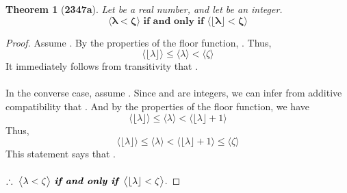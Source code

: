 \documentclass[preview]{standalone}
\newtheorem{theorem}{Theorem}
\begin{document}
\begin{theorem}[\textbf{2347a}]
    Let \bm{$\lambda$} be a real number, 
    and let \bm{$\zeta$} be an integer. 
    \begin{equation*}
        \bm{\big \langle \lambda < \zeta \big \rangle
            \textbf{ if and only if } 
        \big \langle \lfloor \lambda \rfloor < \zeta \big \rangle
        }
    \end{equation*}
\end{theorem}

\begin{proof}
    Assume \bm{$\lambda < \zeta$}. 
    By the properties of the floor function,
    \bm{$\lfloor \lambda \rfloor \leq \lambda$}. 
    Thus,
    \begin{equation*}
        \Big \langle \lfloor \lambda \rfloor \Big \rangle
            \leq 
        \Big \langle \lambda \Big \rangle
            < 
        \Big \langle \zeta \Big \rangle
    \end{equation*}
    It immediately follows from transitivity that 
    \bm{$\lfloor \lambda \rfloor < \zeta$}.
    \\ \\
    In the converse case, 
    assume \bm{$\lfloor \lambda \rfloor < \zeta$}. 
    Since \bm{$\lfloor \lambda \rfloor$} and \bm{$\zeta$} are integers, 
    we can infer from additive compatibility that
    \bm{$\lfloor \lambda \rfloor + 1 \le \zeta$}. 
    And by the properties of the floor function, we have
    \begin{equation*}
        \Big \langle \lfloor \lambda \rfloor \Big \rangle
            \leq 
        \Big \langle \lambda \Big \rangle 
            <
        \Big \langle \lfloor \lambda \rfloor + 1 \Big \rangle
    \end{equation*}
    Thus,
    \begin{equation*}
        \Big \langle \lfloor \lambda \rfloor \Big \rangle
            \le 
        \Big \langle \lambda \Big \rangle
            < 
        \Big \langle \lfloor \lambda \rfloor + 1 \Big \rangle
            \le 
        \Big \langle \zeta \Big \rangle
    \end{equation*}
    This statement says that \bm{$\lambda < \zeta$}.
    \\ \\
    $\therefore \text{\space} \relax{
        \big \langle \lambda < \zeta \big \rangle
            \textbf{ \emph{if and only if} } 
        \big \langle \lfloor \lambda \rfloor < \zeta \big \rangle
    }$.
\end{proof}
\end{document}
